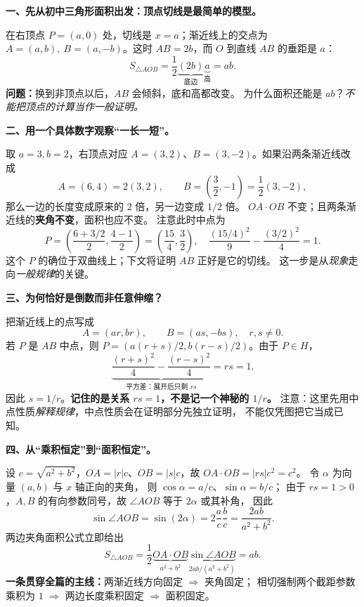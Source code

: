 \clearpage
\begin{explanationbox}
\textbf{一、先从初中三角形面积出发：顶点切线是最简单的模型。}

\begin{center}

\end{center}
在右顶点 $P=(a,0)$ 处，切线是 $x=a$；渐近线上的交点为
$A=(a,b),\ B=(a,-b)$。这时 $AB=2b$，而 $O$ 到直线 $AB$
的垂距是 $a$：
\[
S_{\triangle AOB}=\frac12\underbrace{(2b)}_{\text{底边}}
\underbrace{a}_{\text{高}}=ab.
\]
\textbf{问题：}换到非顶点以后，$AB$ 会倾斜，底和高都改变。
为什么面积还能是 $ab$？\emph{不能把顶点的计算当作一般证明。}

\medskip
\textbf{二、用一个具体数字观察``一长一短''。}

取 $a=3,b=2$，右顶点对应
$A=(3,2)$、$B=(3,-2)$。如果沿两条渐近线改成
\[
A=(6,4)=2(3,2),\qquad
B=\left(\frac32,-1\right)=\frac12(3,-2),
\]
那么一边的长度变成原来的 $2$ 倍，另一边变成 $1/2$ 倍。
$OA\cdot OB$ 不变；且两条渐近线的\textbf{夹角不变}，面积也应不变。
注意此时中点为
\[
P=\left(\frac{6+3/2}{2},\frac{4-1}{2}\right)
=\left(\frac{15}{4},\frac32\right),\quad
\frac{(15/4)^2}{9}-\frac{(3/2)^2}{4}=1.
\]
这个 $P$ 的确位于双曲线上；下文将证明 $AB$ 正好是它的切线。
这一步是从\emph{现象}走向\emph{一般规律}的关键。


\medskip
\pagebreak\noindent\textbf{三、为何恰好是倒数而非任意伸缩？}

把渐近线上的点写成
\[
A=(ar,br),\qquad B=(as,-bs),\quad r,s\ne0.
\]
若 $P$ 是 $AB$ 中点，则
$P=(a(r+s)/2,b(r-s)/2)$。由于 $P\in H$，
\[
\underbrace{\frac{(r+s)^2}{4}-\frac{(r-s)^2}{4}}_{\text{平方差：展开后只剩 }rs}
=rs=1.
\]
因此 $s=1/r$。\textbf{记住的是关系 $rs=1$，不是记一个神秘的 $1/r$。}
注意：这里先用中点性质\emph{解释规律}，中点性质会在证明部分先独立证明，
不能仅凭图把它当成已知。

\begin{center}

\end{center}

\medskip
\textbf{四、从``乘积恒定''到``面积恒定''。}

设 $c=\sqrt{a^2+b^2}$，$OA=|r|c$、$OB=|s|c$，故
$OA\cdot OB=|rs|c^2=c^2$。
令 $\alpha$ 为向量 $(a,b)$ 与 $x$ 轴正向的夹角，
则 $\cos\alpha=a/c$、$\sin\alpha=b/c$；
由于 $rs=1>0$，$A,B$ 的有向参数同号，故 $\angle AOB$ 等于 $2\alpha$ 或其补角，
因此
\[
\sin\angle AOB=\sin(2\alpha)
=2\frac ac\frac bc=\frac{2ab}{a^2+b^2}.
\]
两边夹角面积公式立即给出
\[
S_{\triangle AOB}=\frac12\underbrace{OA\cdot OB}_{a^2+b^2}
\underbrace{\sin\angle AOB}_{2ab/(a^2+b^2)}=ab.
\]
\textbf{一条贯穿全篇的主线：}两渐近线方向固定 $\Rightarrow$ 夹角固定；
相切强制两个截距参数乘积为 $1$ $\Rightarrow$ 两边长度乘积固定
$\Rightarrow$ 面积固定。
\end{explanationbox}
